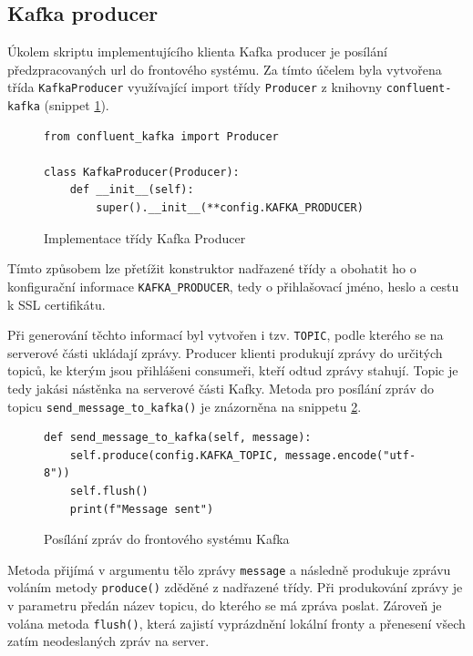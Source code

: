 \documentclass[thesis=M,czech,hidelinks]{FITthesis}[2013/05/06]
\begin{document}
\subsection{Kafka producer} \label{sec:kafkaproducer}
Úkolem skriptu implementujícího klienta Kafka producer je posílání předzpracovaných url do frontového systému. Za tímto účelem byla vytvořena třída \texttt{KafkaProducer} využívající import třídy \texttt{Producer} z knihovny \texttt{confluent-kafka} (snippet \ref{snip:kafkaproducer}).
\begin{figure}[h]               
	\begin{verbatim}
from confluent_kafka import Producer

class KafkaProducer(Producer):
    def __init__(self):
        super().__init__(**config.KAFKA_PRODUCER)
	\end{verbatim}      
	\caption{Implementace třídy Kafka Producer}
	\label{snip:kafkaproducer}
\end{figure}
Tímto způsobem lze přetížit konstruktor nadřazené třídy a obohatit ho o konfigurační informace \texttt{KAFKA_PRODUCER}, tedy o přihlašovací jméno, heslo a cestu k SSL certifikátu.

Při generování těchto informací byl vytvořen i tzv. \texttt{TOPIC}, podle kterého se na serverové části ukládají zprávy. Producer klienti produkují zprávy do určitých topiců, ke kterým jsou přihlášeni consumeři, kteří odtud zprávy stahují. Topic je tedy jakási nástěnka na serverové části Kafky. Metoda pro posílání zpráv do topicu \texttt{send_message_to_kafka()} je znázorněna na snippetu \ref{snip:kafkasend}.
\begin{figure}[h]               
	\begin{verbatim}
def send_message_to_kafka(self, message):
    self.produce(config.KAFKA_TOPIC, message.encode("utf-8"))
    self.flush()
    print(f"Message sent")
	\end{verbatim}      
	\caption{Posílání zpráv do frontového systému Kafka}
	\label{snip:kafkasend}
\end{figure}
Metoda přijímá v argumentu tělo zprávy \texttt{message} a následně produkuje zprávu voláním metody \texttt{produce()} zděděné z nadřazené třídy. Při produkování zprávy je v parametru předán název topicu, do kterého se má zpráva poslat. Zároveň je volána metoda \texttt{flush()}, která zajistí vyprázdnění lokální fronty a přenesení všech zatím neodeslaných zpráv na server.
\end{document}
